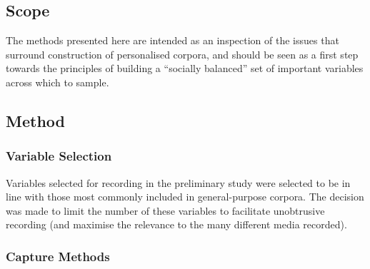 
% 
% 


\subsection{Scope}
The methods presented here are intended as an inspection of the issues that surround construction of personalised corpora, and should be seen as a first step towards the principles of building a ``socially balanced'' set of important variables across which to sample.  


\subsection{Method}

\subsubsection{Variable Selection}
Variables selected for recording in the preliminary study were selected to be in line with those most commonly included in general-purpose corpora.  The decision was made to limit the number of these variables to facilitate unobtrusive recording (and maximise the relevance to the many different media recorded).





\subsubsection{Capture Methods}



